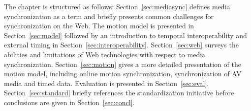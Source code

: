The chapter is structured as follows: Section~\ref{sec:mediasync} defines media
synchronization as a term and briefly presents common challenges for
synchronization on the Web. The motion model is presented in
Section~\ref{sec:model} followed by an introduction to temporal interoperability
and external timing in Section~\ref{sec:interoperability}. Section~\ref{sec:web} surveys the abilities and limitations of Web technologies with respect to media synchronization.
Section~\ref{sec:motion} gives a more detailed presentation of the motion model, including online motion synchronization, synchronization of AV media and timed data. Evaluation is presented in Section~\ref{sec:eval}.
Section~\ref{sec:standard} briefly references the standardization initiative before
conclusions are given in Section~\ref{sec:concl}.

